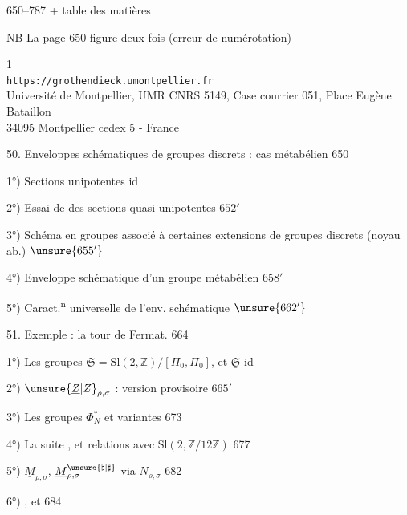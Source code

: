 650--787 + table des matières

\uline{NB} La page 650 figure deux fois (erreur de numérotation)


\begin{center}
\small
1\\
\texttt{https://grothendieck.umontpellier.fr}\\
Université de Montpellier, UMR CNRS 5149, Case courrier 051, Place Eugène Bataillon\\
34095 Montpellier cedex 5 - France
\end{center}
50. Enveloppes schématiques de groupes discrets : cas métabélien \hfill 650

1°) Sections unipotentes \hfill id

2°) Essai de  des sections quasi-unipotentes \hfill $652'$

3°) Schéma en groupes associé à certaines extensions de groupes discrets (noyau ab.) \hfill $\unsure{655'}$

4°) Enveloppe schématique d'un groupe métabélien \hfill $658'$

5°) Caract.\textsuperscript{n} universelle de l'env. schématique \hfill $\unsure{662'}$

51. Exemple : la tour de Fermat. \hfill 664

1°) Les groupes $\mathfrak S=\mathrm{Sl}(2,\mathbb Z)/[\Pi_0,\Pi_0]$, et $\underline{\mathfrak S}$ \hfill id

2°) $\unsure{\underline Z|Z}_{\rho,\sigma}$ : version provisoire \hfill $665'$

3°) Les groupes $\Phi_N^*$ et variantes \hfill 673

4°) La suite
,
et relations avec $\mathrm{Sl}(2,\mathbb Z/12\mathbb Z)$ \hfill 677

5°) $\underline M_{\rho,\sigma}$, $\underline M^{\unsure{\natural|\sharp}}_{\rho,\sigma}$ via $N_{\rho,\sigma}$ \hfill 682

6°)  
,
et
\hfill 684


